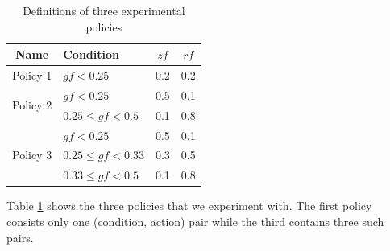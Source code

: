 \documentclass[final,5p,times,twocolumn,authoryear]{elsarticle}
\begin{document}
\begin{table}[h!]
	\centering
	\scriptsize  %
	\setlength{\tabcolsep}{3pt}  %
	\renewcommand{\arraystretch}{1.1}  %
	\begin{tabular}{|c|l|c|c|}
		\hline
		\textbf{Name} & \textbf{Condition}                  & \textbf{$zf$} & \textbf{$rf$} \\ \hline
		
		\multirow{1}{*}{Policy 1} 
		& $ gf < 0.25 $ & 0.2 & 0.2  \\ \hline 
		
		\multirow{2}{*}{Policy 2} 
		& $ gf < 0.25 $ & 0.5 & 0.1  \\ \cline{2-4} 
		& $ 0.25 \leq gf < 0.5 $  & 0.1 & 0.8  \\ \hline
		
		\multirow{3}{*}{Policy 3} 
		& $ gf < 0.25 $ & 0.5 & 0.1  \\ \cline{2-4} 
		& $ 0.25 \leq gf < 0.33 $  & 0.3 & 0.5  \\ \cline{2-4}
		& $ 0.33 \leq gf < 0.5 $  & 0.1 & 0.8  \\ \hline
		
	\end{tabular}
	\caption{Definitions of three experimental policies}
	\label{tab:policy_defs}
\end{table}

Table \ref{tab:policy_defs} shows the three policies that we experiment with. The first policy consists only one (condition, action) pair while the third contains three such pairs. 
\end{document}

